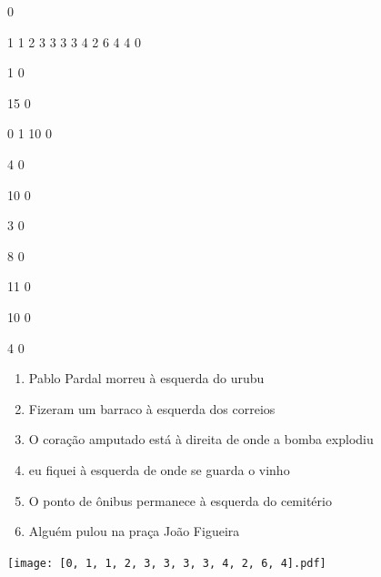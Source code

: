\documentclass[12pt]{article}
\begin{document}
		\vfill  
		  
{
	0	%

	1	%
	1	%
	2	%
	3	%
	3	%
	3	%
	3	%
	4	%
	2	%
	6	%
	4	%
	4	%
	0	%

	1	%
	0	%

	15	%
	0	%

	0	%
	1	%
	10	%
	0	%

	4	%
	0	%

	10	%
	0	%

	3	%
	0	%

	8	%
	0	%

	11	%
	0	%

	10	%
	0	%

	4	%
	0	%

}	  
		    	

		 

\pagebreak


	\begin{enumerate}
		  \sffamily %
		  \large %


\vfill \item
Pablo Pardal morreu	%
à esquerda
do urubu	%

\vfill \item
Fizeram um barraco	%
à esquerda
dos correios	%

\vfill \item
O coração amputado está	%
à direita
de onde a bomba explodiu	%

\vfill \item
eu fiquei	%
à esquerda
de onde se guarda o vinho	%

\vfill \item
O ponto de ônibus permanece	%
à esquerda
do cemitério	%

\vfill \item
Alguém pulou	%
na praça João Figueira	%
	\end{enumerate}
		  
		  \hfill

		  \vfill

\texttt{[image: [0, 1, 1, 2, 3, 3, 3, 3, 4, 2, 6, 4].pdf]}


	\hfill	  	  
\end{document}
